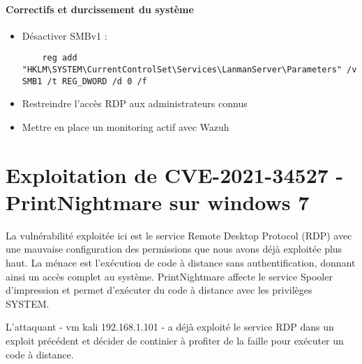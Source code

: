 \documentclass[a4paper,12pt]{report}
\begin{document}
\paragraph{Correctifs et durcissement du système}
\begin{itemize}
    \item Désactiver SMBv1 :
    \begin{lstlisting}
    reg add "HKLM\SYSTEM\CurrentControlSet\Services\LanmanServer\Parameters" /v SMB1 /t REG_DWORD /d 0 /f
    \end{lstlisting}
    \item Restreindre l’accès RDP aux administrateurs connus
    \item Mettre en place un monitoring actif avec Wazuh
\end{itemize}

\section{Exploitation de CVE-2021-34527 - PrintNightmare sur windows 7}

La vulnérabilité exploitée ici est le service Remote Desktop Protocol (RDP) avec une mauvaise configuration des permissions que nous avons déjà exploitée plus haut.  La ménace est l’exécution de code à distance sans authentification, donnant ainsi un accès complet au système. PrintNightmare affecte le service Spooler d'impression et permet d'exécuter du code à distance avec les privilèges SYSTEM.

L'attaquant - vm kali 192.168.1.101 - a déjà exploité le service RDP dans un exploit précédent et décider de continier à profiter de la faille pour exécuter un code à distance.
\end{document}

